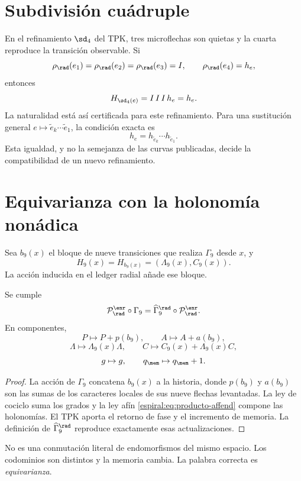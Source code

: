 \section{Subdivisión cuádruple}

En el refinamiento \(\sd_4\) del TPK, tres microflechas son quietas y la
cuarta reproduce la transición observable. Si
\[
 \rho_{\rad}(e_1)=\rho_{\rad}(e_2)=\rho_{\rad}(e_3)=I,
 \qquad \rho_{\rad}(e_4)=h_e,
\]
entonces
\[
 H_{\sd_4(e)}=I\,I\,I\,h_e=h_e.
\]
La naturalidad está así certificada para este refinamiento. Para una
sustitución general \(e\mapsto\widetilde e_k\cdots\widetilde e_1\), la
condición exacta es
\[
 h_e=h_{\widetilde e_k}\cdots h_{\widetilde e_1}.
\]
Esta igualdad, y no la semejanza de las curvas publicadas, decide la
compatibilidad de un nuevo refinamiento.

\section{Equivarianza con la holonomía nonádica}

Sea \(b_9(x)\) el bloque de nueve transiciones que realiza \(\Gamma_9\) desde
\(x\), y
\[
 H_9(x)=H_{b_9(x)}=(\Lambda_9(x),C_9(x)).
\]
La acción inducida en el ledger radial añade ese bloque.

\begin{theorem}
Se cumple
\begin{equation}
 \mathcal P_{\rad}^{\enr}\circ\Gamma_9
 =\widehat\Gamma_9^{\rad}\circ
 \mathcal P_{\rad}^{\enr}.
 \label{espiral:eq:equivarianza-gamma9}
\end{equation}
En componentes,
\[
 P\mapsto P+p(b_9),
 \qquad
 A\mapsto A+a(b_9),
\]
\[
 \Lambda\mapsto\Lambda_9(x)\Lambda,
 \qquad
 C\mapsto C_9(x)+\Lambda_9(x)C,
\]
\[
 g\mapsto g,\qquad q_{\mem}\mapsto q_{\mem}+1.
\]
\end{theorem}
\begin{proof}
La acción de \(\Gamma_9\) concatena \(b_9(x)\) a la historia, donde
\(p(b_9)\) y \(a(b_9)\) son las sumas de los caracteres locales de sus nueve
flechas levantadas. La ley de cociclo suma los grados y la ley afín
\cref{espiral:eq:producto-affend} compone las holonomías. El TPK aporta el retorno de
fase y el incremento de memoria. La definición de
\(\widehat\Gamma_9^{\rad}\) reproduce exactamente esas actualizaciones.
\end{proof}

No es una conmutación literal de endomorfismos del mismo espacio. Los
codominios son distintos y la memoria cambia. La palabra correcta es
\emph{equivarianza}.

